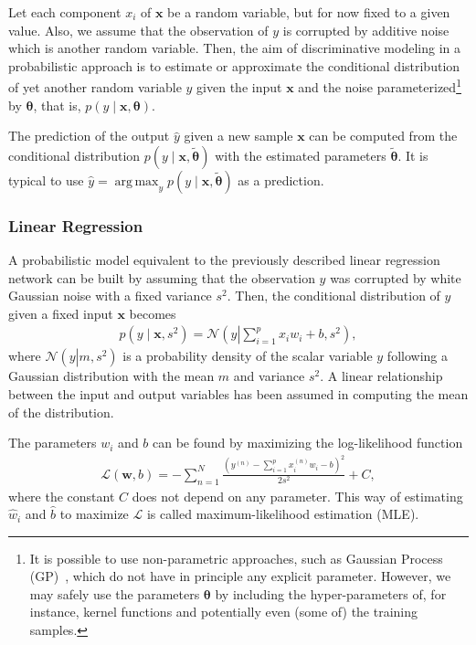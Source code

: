 \documentclass{now}
\newcommand{\vect}[1]{\mathbf{#1}}
\newcommand{\vects}[1]{\boldsymbol{#1}}
\newcommand{\vx}[0]{\vect{x}}
\newcommand{\vw}[0]{\vect{w}}
\newcommand{\TT}[0]{{\vects{\theta}}}
\newcommand{\NN}[0]{\mathcal{N}}
\newcommand{\LL}[0]{\mathcal{L}}
\DeclareMathOperator*{\argmax}{arg\,max}
\begin{document}
Let each component $x_i$ of $\vx$ be a random variable, but for now fixed to a
given value. Also, we assume that the observation of $y$ is corrupted by
additive noise which is another random variable.
Then, the aim of
discriminative modeling in a probabilistic approach is to
estimate or approximate the conditional distribution of
yet another random variable $y$ given the input $\vx$ and
the noise parameterized\footnote{
    It is possible to use non-parametric approaches, such as Gaussian Process
    (GP)~\citep[see,
    e.g.,][]{Rasmussen2006}, which do not have in principle any explicit
    parameter. However, we may safely use the parameters $\TT$ by including the
    hyper-parameters of, for instance, kernel functions and potentially even
    (some of) the training samples.
} by $\TT$, that is, ${p(y \mid \vx, \TT)}$.

The prediction of the output $\hat{y}$ given a new sample $\vx$ can be computed
from the conditional distribution $p(y \mid \vx, \tilde{\TT})$ with the
estimated parameters $\tilde{\TT}$. It is typical to use $\hat{y} = \argmax_y
p(y\mid\vx, \tilde{\TT})$ as a prediction.

\subsubsection{Linear Regression}

A probabilistic model equivalent to the previously described linear regression
network can be built by assuming that the observation $y$ was corrupted by white
Gaussian noise with a fixed variance $s^2$.  Then, the conditional distribution
of $y$ given a fixed input $\vx$ becomes
\begin{align*}
    p(y \mid \vx, s^2) = \NN \left( y \left| \sum_{i=1}^p
    x_i w_i + b, s^2\right.\right),
\end{align*}
where $\NN \left( y \left| m, s^2\right.\right)$ is a probability density of the
scalar variable $y$ following a Gaussian distribution with the mean $m$ and
variance $s^2$. A linear relationship between the input and output variables has
been assumed in computing the mean of the distribution.

The parameters $w_i$ and $b$ can be found by maximizing the log-likelihood
function
\begin{align}
    \label{eq:linreg_ll}
    \LL(\vw, b) = -\sum_{n=1}^N \frac{\left( y^{(n)} -
    \sum_{i=1}^p x_i^{(n)} w_i - b \right)^2}{2 s^2} +
    C,
\end{align}
where the constant $C$ does not depend on any parameter.  This way of estimating
$\hat{w}_i$ and $\hat{b}$ to maximize $\LL$ is called maximum-likelihood
estimation (MLE).
\end{document}
